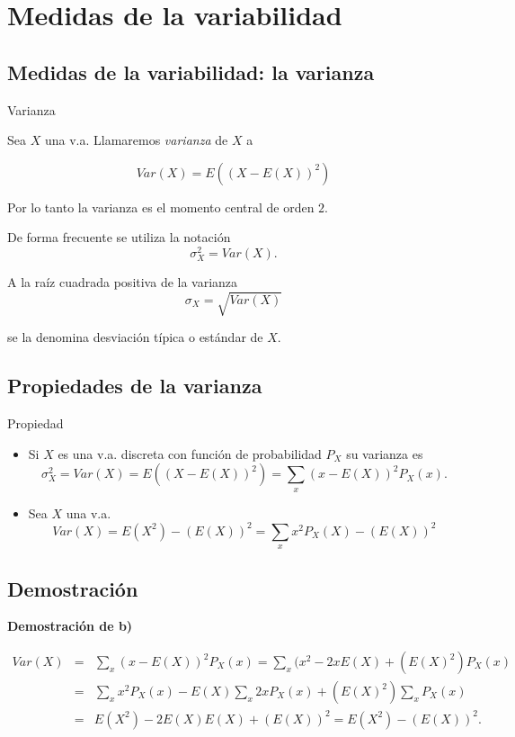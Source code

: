 \documentclass[]{book}
\providecommand{\tightlist}{%
  \setlength{\itemsep}{0pt}\setlength{\parskip}{0pt}}
\begin{document}
\hypertarget{medidas-de-la-variabilidad}{%
\section{Medidas de la variabilidad}\label{medidas-de-la-variabilidad}}

\hypertarget{medidas-de-la-variabilidad-la-varianza}{%
\subsection{Medidas de la variabilidad: la varianza}\label{medidas-de-la-variabilidad-la-varianza}}

 Varianza

Sea \(X\) una v.a. Llamaremos \emph{varianza} de \(X\) a

\[Var(X)=E((X-E(X))^2)\]

Por lo tanto la varianza es el momento central de orden \(2\).

De forma frecuente se utiliza la notación \[\sigma_{X}^2=Var(X).\]

A la raíz cuadrada positiva de la varianza
\[\sigma_{X}=\sqrt{Var(X)}\]

se la denomina desviación típica o estándar de \(X\).

\hypertarget{propiedades-de-la-varianza}{%
\subsection{Propiedades de la varianza}\label{propiedades-de-la-varianza}}

 Propiedad

\begin{itemize}
\tightlist
\item
  Si \(X\) es una v.a. discreta con función de probabilidad \(P_X\) su varianza es
  \[\sigma_{X}^2=Var(X)=E((X-E(X))^2)=\sum_{x}(x-E(X))^2 P_{X}(x).\]
\item
  Sea \(X\) una v.a.
  \[Var(X)=E(X^2)-(E(X))^2=\sum_{x} x^2 P_{X}(X)-(E(X))^2\]
\end{itemize}

\hypertarget{demostraciuxf3n}{%
\subsection{Demostración}\label{demostraciuxf3n}}

\textbf{Demostración de b)}

\begin{eqnarray*}
Var(X)&= & \sum_{x}(x-E(X))^2 P_{X}(x) = \sum_{x}(x^2 -2 x E(X)+(E(X)^2) P_{X}(x)\\
&=& \sum_{x}x^2P_{X}(x) -  E(X)\sum_{x}2 x P_{X}(x) + (E(X)^2)\sum_{x} P_{X}(x)\\
&=& E(X^2)- 2 E(X) E(X) + (E(X))^2=E(X^2)-(E(X))^2.
\end{eqnarray*}
\end{document}
